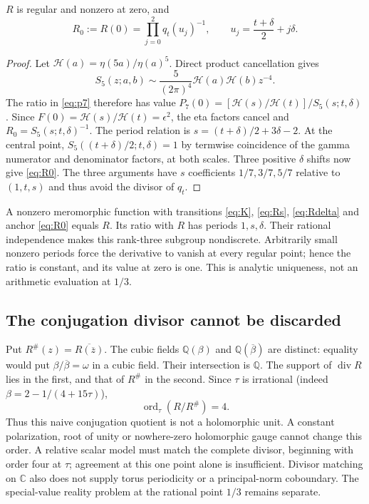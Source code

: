 \begin{theorem}\label{thm:anchor}
$R$ is regular and nonzero at zero, and
\begin{equation}\label{eq:R0}
 R_0:=R(0)=\prod_{j=0}^{2}q_t(u_j)^{-1},\qquad
 u_j=\frac{t+\delta}{2}+j\delta.
\end{equation}
\end{theorem}
\begin{proof}
Let $\mathcal H(a)=\eta(5a)/\eta(a)^5$. Direct product cancellation gives
\[
 S_5(z;a,b)\sim\frac5{(2\pi)^4}\mathcal H(a)\mathcal H(b)z^{-4}.
\]
The ratio in \eqref{eq:p7} therefore has value $P_7(0)=[\mathcal H(s)/\mathcal H(t)]/S_5(s;t,\delta)$. Since $F(0)=\mathcal H(s)/\mathcal H(t)=\epsilon^2$, the eta factors cancel and $R_0=S_5(s;t,\delta)^{-1}$. The period relation is $s=(t+\delta)/2+3\delta-2$. At the central point, $S_5((t+\delta)/2;t,\delta)=1$ by termwise coincidence of the gamma numerator and denominator factors, at both scales. Three positive $\delta$ shifts now give \eqref{eq:R0}. The three arguments have $s$ coefficients $1/7,3/7,5/7$ relative to $(1,t,s)$ and thus avoid the divisor of $q_t$.
\end{proof}
A nonzero meromorphic function with transitions \eqref{eq:K}, \eqref{eq:Rs}, \eqref{eq:Rdelta} and anchor \eqref{eq:R0} equals $R$. Its ratio with $R$ has periods $1,s,\delta$. Their rational independence makes this rank-three subgroup nondiscrete. Arbitrarily small nonzero periods force the derivative to vanish at every regular point; hence the ratio is constant, and its value at zero is one. This is analytic uniqueness, not an arithmetic evaluation at $1/3$.

\subsection{The conjugation divisor cannot be discarded}
Put $R^\#(z)=\overline{R(\overline z)}$. The cubic fields $\mathbb Q(\beta)$ and $\mathbb Q(\overline\beta)$ are distinct: equality would put $\beta/\overline\beta=\omega$ in a cubic field. Their intersection is $\mathbb Q$. The support of $\operatorname{div}R$ lies in the first, and that of $R^\#$ in the second. Since $\tau$ is irrational (indeed $\beta=2-1/(4+15\tau)$),
\[
 \operatorname{ord}_{\tau}(R/R^\#)=4.
\]
Thus this naive conjugation quotient is not a holomorphic unit. A constant polarization, root of unity or nowhere-zero holomorphic gauge cannot change this order. A relative scalar model must match the complete divisor, beginning with order four at $\tau$; agreement at this one point alone is insufficient. Divisor matching on $\mathbb C$ also does not supply torus periodicity or a principal-norm coboundary. The special-value reality problem at the rational point $1/3$ remains separate.
